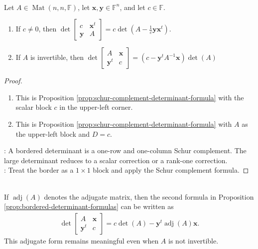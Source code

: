 \begin{proposition} \label{prop:bordered-determinant-formulas} \\
Let $A\in\operatorname{Mat}(n,n,\mathbb{F})$, let $\mathbf{x},\mathbf{y}\in\mathbb{F}^n$, and let $c\in\mathbb{F}$.
\begin{enumerate}[label=(\roman*)]
\setlength{\itemsep}{0pt}
\item If $c\neq0$, then $\det
\begin{bmatrix}
c & \mathbf{x}^t\\
\mathbf{y} & A
\end{bmatrix}
=
c\det\left(A-\frac{1}{c}\mathbf{y}\mathbf{x}^t\right)$.
\item If $A$ is invertible, then $\det
\begin{bmatrix}
A & \mathbf{x}\\
\mathbf{y}^t & c
\end{bmatrix}
=
\left(c-\mathbf{y}^tA^{-1}\mathbf{x}\right)\det(A)$
\end{enumerate}
\begin{proof}
\begin{enumerate}[label=(\roman*)]
\setlength{\itemsep}{0pt}
\item This is Proposition \ref{prop:schur-complement-determinant-formula} with the scalar block $c$ in the upper-left corner.
\item This is Proposition \ref{prop:schur-complement-determinant-formula} with $A$ as the upper-left block and $D=c$.
\end{enumerate}
: A bordered determinant is a one-row and one-column Schur complement. The large determinant reduces to a scalar correction or a rank-one correction.\\
: Treat the border as a $1\times1$ block and apply the Schur complement formula.
\end{proof}
\end{proposition}

\begin{remark} \label{rem:bordered-determinant-adjugate-form} \\
If $\operatorname{adj}(A)$ denotes the adjugate matrix, then the second formula in Proposition \ref{prop:bordered-determinant-formulas} can be written as
\begin{align}
\det
\begin{bmatrix}
A & \mathbf{x}\\
\mathbf{y}^t & c
\end{bmatrix}
=
c\det(A)-\mathbf{y}^t\operatorname{adj}(A)\mathbf{x}.
\nonumber
\end{align}
This adjugate form remains meaningful even when $A$ is not invertible.
\end{remark}

